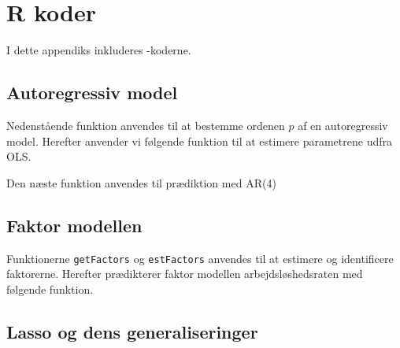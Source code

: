 \chapter{R koder} \label{app:r_koder}
I dette appendiks inkluderes \Rlang-koderne. 

\section{Autoregressiv model} \label{sec:auto}
Nedenstående funktion anvendes til at bestemme ordenen $p$ af en autoregressiv model.  
%
Herefter anvender vi følgende funktion til at estimere parametrene udfra OLS. 

Den næste funktion anvendes til prædiktion med AR(4) 

\section{Faktor modellen} \label{sec:faktor}
Funktionerne \texttt{getFactors} og \texttt{estFactors} anvendes til at estimere og identificere faktorerne. 
%
%
Herefter prædikterer faktor modellen arbejdsløshedsraten med følgende funktion.


\section{Lasso og dens generaliseringer} \label{sec:lasso}


